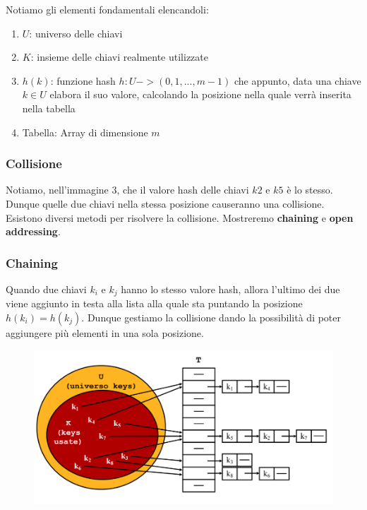 \documentclass{article}
\begin{document}
Notiamo gli elementi fondamentali elencandoli:

\begin{enumerate}
    \item $U$: universo delle chiavi
    \item $K$: insieme delle chiavi realmente utilizzate
    \item $h(k)$: funzione hash $h: U -> (0,1, ... ,m-1)$ che appunto, data una chiave $k \in U$ elabora il suo valore, calcolando la posizione nella quale verrà inserita nella tabella
    \item Tabella: Array di dimensione $m$
\end{enumerate}

\subsubsection{Collisione} Notiamo, nell'immagine 3, che il valore hash delle chiavi $k2$ e $k5$ è lo stesso. Dunque quelle due chiavi nella stessa posizione causeranno una collisione. Esistono diversi metodi per risolvere la collisione. Mostreremo \textbf{chaining} e \textbf{open addressing}.

\subsubsection{Chaining} Quando due chiavi $k_{i}$ e $k_{j}$ hanno lo stesso valore hash, allora l'ultimo dei due viene aggiunto in testa alla lista alla quale sta puntando la posizione $h(k_{i})=h(k_{j})$. Dunque gestiamo la collisione dando la possibilità di poter aggiungere più elementi in una sola posizione.

\begin{figure}[htbp]
        \center
        \includegraphics[scale=0.35]{img/hashMap2.png}
    \end{figure}
\end{document}
